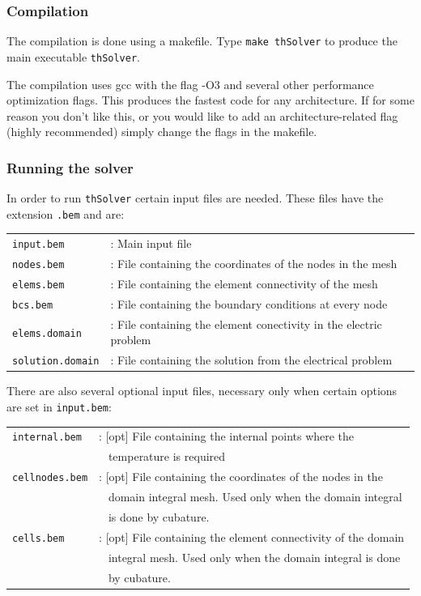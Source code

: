 \documentclass[12pt]{article}
\begin{document}
\subsubsection*{Compilation}

The compilation is done using a makefile. Type \verb+make thSolver+ to produce the main executable \verb+thSolver+.

The compilation uses gcc with the flag -O3 and several other performance optimization flags. This produces the fastest code for any architecture. If for some reason you don't like this, or you would like to add an architecture-related flag (highly recommended) simply change the flags in the makefile. 

\subsubsection*{Running the solver}
In order to run \verb+thSolver+ certain input files are needed. These files have the extension \verb+.bem+ and are:

\begin{tabular}{ll}
\texttt{input.bem}&: Main input file\\
\texttt{nodes.bem}&: File containing the coordinates of the nodes in the mesh\\
\texttt{elems.bem}&: File containing the element connectivity of the mesh\\
\texttt{bcs.bem}&: File containing the boundary conditions at every node\\
\texttt{elems.domain}&: File containing the element conectivity in the electric problem\\
\texttt{solution.domain}&: File containing the solution from the electrical problem
\end{tabular}

There are also several optional input files, necessary only when certain options are set in \verb+input.bem+:

\begin{tabular}{ll}
\texttt{internal.bem} &: [opt] File containing the internal points where the\\
  & \verb+ + temperature is required\\
\texttt{cellnodes.bem}&: [opt] File containing the coordinates of the nodes in the \\
  & \verb+ + domain integral mesh. Used only when the domain integral\\
  & \verb+ + is done by cubature.\\
\texttt{cells.bem} &: [opt] File containing the element connectivity of the domain\\
  & \verb+ + integral mesh. Used only when the domain integral is done \\
  & \verb+ + by cubature.
\end{tabular}
\end{document}
